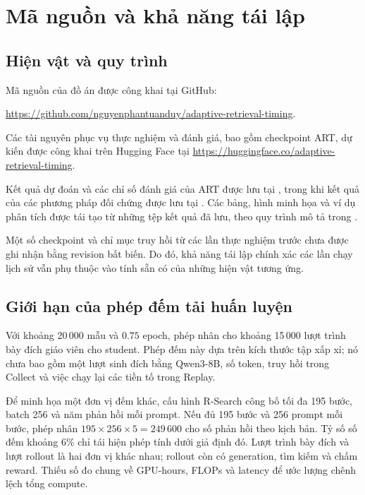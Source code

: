 \chapter{Mã nguồn và khả năng tái lập}
\label{app:repro}
\section{Hiện vật và quy trình}
{\SingleSpacing\raggedright Mã nguồn của đồ án được công khai tại GitHub:\par
\url{https://github.com/nguyenphantuanduy/adaptive-retrieval-timing}.\par
Các tài nguyên phục vụ thực nghiệm và đánh giá, bao gồm checkpoint ART, dự kiến được công khai trên Hugging Face tại \url{https://huggingface.co/adaptive-retrieval-timing}.\par}

Kết quả dự đoán và các chỉ số đánh giá của ART được lưu tại , trong khi kết quả của các phương pháp đối chứng được lưu tại . Các bảng, hình minh họa và ví dụ phân tích được tái tạo từ những tệp kết quả đã lưu, theo quy trình mô tả trong .

Một số checkpoint và chỉ mục truy hồi từ các lần thực nghiệm trước chưa được ghi nhận bằng revision bất biến. Do đó, khả năng tái lập chính xác các lần chạy lịch sử vẫn phụ thuộc vào tính sẵn có của những hiện vật tương ứng.

\section{Giới hạn của phép đếm tải huấn luyện}
{\SingleSpacing
Với khoảng 20\,000 mẫu và \(0.75\) epoch, phép nhân cho khoảng 15\,000 lượt trình bày đích giáo viên cho student. Phép đếm này dựa trên kích thước tập xấp xỉ; nó chưa bao gồm một lượt sinh đích bằng Qwen3-8B, số token, truy hồi trong Collect và việc chạy lại các tiền tố trong Replay.

Để minh họa một đơn vị đếm khác, cấu hình R-Search công bố tối đa 195 bước, batch 256 và năm phản hồi mỗi prompt\cite{rsearch}. Nếu đủ 195 bước và 256 prompt mỗi bước, phép nhân \(195\times256\times5=249\,600\) cho số phản hồi theo kịch bản. Tỷ số số đếm khoảng \(6\%\) chỉ tái hiện phép tính dưới giả định đó. Lượt trình bày đích và lượt rollout là hai đơn vị khác nhau; rollout còn có generation, tìm kiếm và chấm reward. Thiếu số đo chung về GPU-hours, FLOPs và latency để ước lượng chênh lệch tổng compute.\par}

